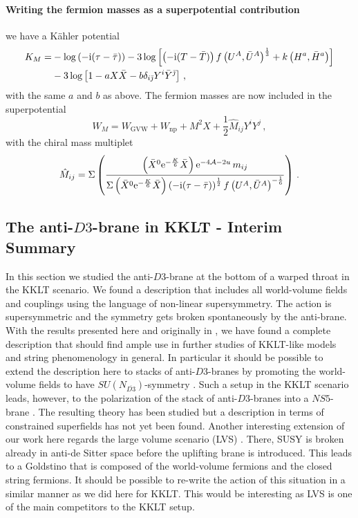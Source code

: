 \documentclass[12pt]{report}
\newcommand{\be}{\begin{equation}}
\newcommand{\ee}{\end{equation}}
\newcommand{\bea}{\begin{equation}\begin{aligned}}
\newcommand{\eea}{\end{aligned}\end{equation}}
\def\rmi{{\rm i}}
\def\rme{{\rm e}}
\def\jb{{\bar \jmath}}
\begin{document}
\paragraph{Writing the fermion masses as a superpotential  contribution} we have a Kähler potential
\bea 
K_M = & - \log \left(-\rmi (\tau-\bar{\tau})\right) - 3 \log \left[ \left(-\rmi (T-\bar{T})\right) f\left(U^A,\bar{U}^A \right)^{\frac{1}{3}}+k\left(H^a,\bar{H}^a\right)\right]\\
 & - 3 \log \left[1-a X \bar{X} - b \delta_{i\jb}Y^i \bar{Y}^\jb \right]\,,
 \label{eq:D3barKMfinal}
 \eea
 with the same $a$ and $b$ as above. The fermion masses are now included in the superpotential 
 \be
 W_M = W_{\text{GVW}} + W_{\text{np}} + M^2 X + \frac{1}{2} \hat{M}_{ij} Y^i Y^j\,,
 \label{eq:D3barWMfinal}
 \ee
with the chiral mass multiplet
\be 
\hat{M}_{ij} = \Sigma \left(\frac{\left(\bar{X}^0 \rme^{-\frac{K}{6}}\bar{X}\right)\rme^{-4\mathcal{A}-2u}\,m_{ij}}{\Sigma\left(\bar{X}^0 \rme^{-\frac{K}{6}}\bar{X}\right)\left(-\rmi (\tau-\bar{\tau})\right)^{\frac{1}{2}}f\left(U^A,\bar{U}^A\right)^{-\frac{1}{6}}}\right)\,.
\label{eq:D3barmassmultfinal}
\ee

\subsection{The anti-$D3$-brane in KKLT - Interim Summary}
In this section we studied the anti-$D3$-brane at the bottom of a warped throat in the KKLT scenario. We found a description that includes all world-volume fields and couplings using the language of non-linear supersymmetry. The action is supersymmetric and the symmetry gets broken spontaneously by the anti-brane. With the results presented here and originally in \cite{Cribiori:2019hod}, we have found a complete description that should find ample use in further studies of KKLT-like models and string phenomenology in general. In particular it should be possible to extend the description here to stacks of anti-$D3$-branes by promoting the world-volume fields to have $SU(N_{\overline{D3}})$-symmetry \cite{McGuirk:2012sb}. Such a setup in the KKLT scenario leads, however, to the polarization of the stack of anti-$D3$-branes into a $NS5$-brane \cite{Kachru:2002gs}. The resulting theory \cite{Aalsma:2017ulu,Aalsma:2018pll} has been studied but a description in terms of constrained superfields has not yet been found. Another interesting extension of our work here regards the large volume scenario (LVS) \cite{Balasubramanian:2005zx,Conlon:2005ki}. There, SUSY is broken already in anti-de Sitter space before the uplifting brane is introduced. This leads to a Goldstino that is composed of the world-volume fermions and the closed string fermions. It should be possible to re-write the action of this situation in a similar manner as we did here for KKLT. This would be interesting as LVS is one of the main competitors to the KKLT setup.
\end{document}
